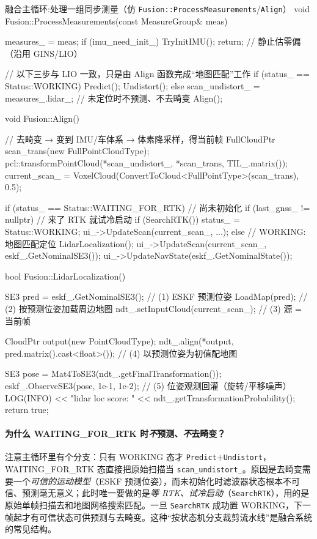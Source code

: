 \begin{codebox}[C++]{融合主循环:处理一组同步测量（仿 \texttt{Fusion::ProcessMeasurements}/\allowbreak\texttt{Align}）}
void Fusion::ProcessMeasurements(const MeasureGroup& meas) {
  measures_ = meas;
  if (imu_need_init_) { TryInitIMU(); return; }      // 静止估零偏（沿用 GINS/LIO）

  // 以下三步与 LIO 一致，只是由 Align 函数完成“地图匹配”工作
  if (status_ == Status::WORKING) { Predict(); Undistort(); }
  else { scan_undistort_ = measures_.lidar_; }       // 未定位时不预测、不去畸变
  Align();
}

void Fusion::Align() {
  // 去畸变 → 变到 IMU/车体系 → 体素降采样，得当前帧
  FullCloudPtr scan_trans(new FullPointCloudType);
  pcl::transformPointCloud(*scan_undistort_, *scan_trans, TIL_.matrix());
  current_scan_ = VoxelCloud(ConvertToCloud<FullPointType>(scan_trans), 0.5);

  if (status_ == Status::WAITING_FOR_RTK) {          // 尚未初始化
    if (last_gnss_ != nullptr) {                     // 来了 RTK 就试冷启动
      if (SearchRTK()) { status_ = Status::WORKING; ui_->UpdateScan(current_scan_, ...); }
    }
  } else {                                           // WORKING:地图匹配定位
    LidarLocalization();
    ui_->UpdateScan(current_scan_, eskf_.GetNominalSE3());
    ui_->UpdateNavState(eskf_.GetNominalState());
  }
}

bool Fusion::LidarLocalization() {
  SE3 pred = eskf_.GetNominalSE3();                   // (1) ESKF 预测位姿
  LoadMap(pred);                                      // (2) 按预测位姿加载周边地图
  ndt_.setInputCloud(current_scan_);                 // (3) 源 = 当前帧

  CloudPtr output(new PointCloudType);
  ndt_.align(*output, pred.matrix().cast<float>());  // (4) 以预测位姿为初值配地图

  SE3 pose = Mat4ToSE3(ndt_.getFinalTransformation());
  eskf_.ObserveSE3(pose, 1e-1, 1e-2);                // (5) 位姿观测回灌（旋转/平移噪声）
  LOG(INFO) << "lidar loc score: " << ndt_.getTransformationProbability();
  return true;
}
\end{codebox}

\paragraph{为什么 \textsf{WAITING\_FOR\_RTK} 时\emph{不}预测、\emph{不}去畸变？}
注意主循环里有个分支：只有 \textsf{WORKING} 态才 \texttt{Predict}+\texttt{Undistort}，\textsf{WAITING\_FOR\_RTK} 态直接把原始扫描当 \texttt{scan\_undistort\_}。原因是去畸变需要一个\emph{可信的运动模型}（ESKF 预测位姿），而未初始化时滤波器状态根本不可信、预测毫无意义；此时唯一要做的是\emph{等 RTK、试冷启动}（\texttt{SearchRTK}），用的是原始单帧扫描去和地图网格搜索匹配。一旦 \texttt{SearchRTK} 成功置 \textsf{WORKING}，下一帧起才有可信状态可供预测与去畸变。这种“按状态机分支裁剪流水线”是融合系统的常见结构。

